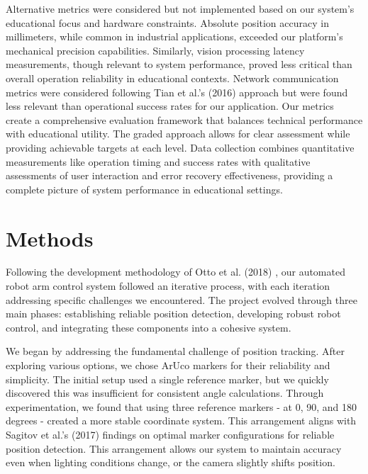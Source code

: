 \documentclass[10pt,twocolumn]{article}
\begin{document}
Alternative metrics were considered but not implemented based on our system's educational focus and hardware constraints. Absolute position accuracy in millimeters, while common in industrial applications, exceeded our platform's mechanical precision capabilities. Similarly, vision processing latency measurements, though relevant to system performance, proved less critical than overall operation reliability in educational contexts. Network communication metrics were considered following Tian et al.'s (2016) \cite{tian2016development} approach but were found less relevant than operational success rates for our application.
Our metrics create a comprehensive evaluation framework that balances technical performance with educational utility. The graded approach allows for clear assessment while providing achievable targets at each level. Data collection combines quantitative measurements like operation timing and success rates with qualitative assessments of user interaction and error recovery effectiveness, providing a complete picture of system performance in educational settings.

\section{Methods}
Following the development methodology of Otto et al. (2018) \cite{otto2018teaching}, our automated robot arm control system followed an iterative process, with each iteration addressing specific challenges we encountered. The project evolved through three main phases: establishing reliable position detection, developing robust robot control, and integrating these components into a cohesive system.

We began by addressing the fundamental challenge of position tracking. After exploring various options, we chose ArUco markers for their reliability and simplicity. The initial setup used a single reference marker, but we quickly discovered this was insufficient for consistent angle calculations. Through experimentation, we found that using three reference markers - at 0, 90, and 180 degrees - created a more stable coordinate system. This arrangement aligns with Sagitov et al.'s (2017) \cite{sagitov2017comparing} findings on optimal marker configurations for reliable position detection. This arrangement allows our system to maintain accuracy even when lighting conditions change, or the camera slightly shifts position.
\end{document}
